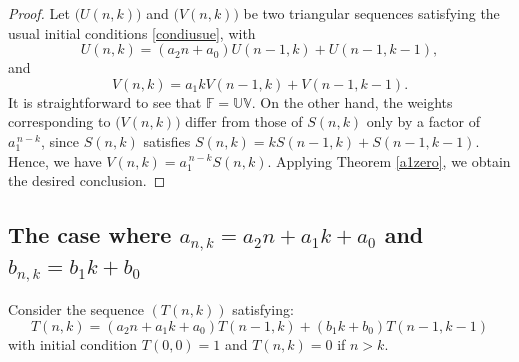 \documentclass[12pt,a4paper]{article}
\theoremstyle{definition} %
\theoremstyle{remark}
\theoremstyle{examples}
\newcommand{\coul}[1]{#1_{n,k}}
\begin{document}
\begin{proof}
	Let $\big(U(n,k)\big)$ and $\big(V(n,k)\big)$ be two triangular sequences satisfying the usual initial conditions \eqref{condiusue}, with
	\begin{equation*}
		U(n,k) = (a_2 n + a_0) U(n-1,k) + U(n-1,k-1),
	\end{equation*}  
	and
	\begin{equation*}
		V(n,k) = a_1 k V(n-1,k) + V(n-1,k-1).
	\end{equation*}
	It is straightforward to see that $\mathbb{F} = \mathbb{U} \mathbb{V}$. On the other hand, the weights corresponding to $\big(V(n,k)\big)$ differ from those of $S(n,k)$ only by a factor of $a_1^{\,n-k}$, since $S(n,k)$ satisfies $S(n,k) = k S(n-1,k) + S(n-1,k-1)$. Hence, we have $V(n,k) = a_1^{\,n-k} S(n,k)$. Applying Theorem \ref{a1zero}, we obtain the desired conclusion.
\end{proof}

\subsection{The case where $\coul{a} = a_2 n + a_1 k + a_0$ and $\coul{b} = b_1k+b_0$}
Consider the sequence $(T(n,k))$ satisfying:
\begin{equation}
T(n,k)=(a_2n+a_1k+a_0)T(n-1,k)+(b_1k+b_0)T(n-1,k-1)
\end{equation}
with initial condition $T(0,0)=1$ and $T(n,k)=0$ if $n>k$.
\end{document}

